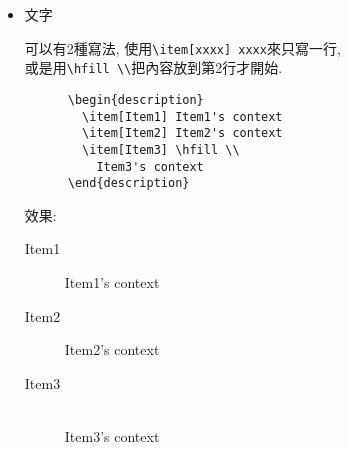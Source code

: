 \begin{itemize}
{\begin{framed}
\begin{verbatim}
          Item3's context
        }

        \item
        {
          Item4

          Item4's context
        }
      \end{itemize}
    \end{verbatim}
    \end{framed}

    效果:
    \begin{itemize}
      \item Item1

      \item Item2

      \item
      {
        Item3

        Item3's context
      }

      \item
      {
        Item4

        Item4's context
      }
    \end{itemize}
  } %

  \newpage
  \item
  {
    文字

    可以有2種寫法, 使用\verb|\item[xxxx] xxxx|來只寫一行, \\
    或是用\verb|\hfill \\|把內容放到第2行才開始.

    \begin{framed}
    \begin{verbatim}
      \begin{description}
        \item[Item1] Item1's context
        \item[Item2] Item2's context
        \item[Item3] \hfill \\
          Item3's context
      \end{description}
    \end{verbatim}
    \end{framed}

    效果:
    \begin{description}
      \item[Item1] Item1's context
      \item[Item2] Item2's context
      \item[Item3] \hfill \\
        Item3's context
    \end{description}
  } %


\end{itemize}
